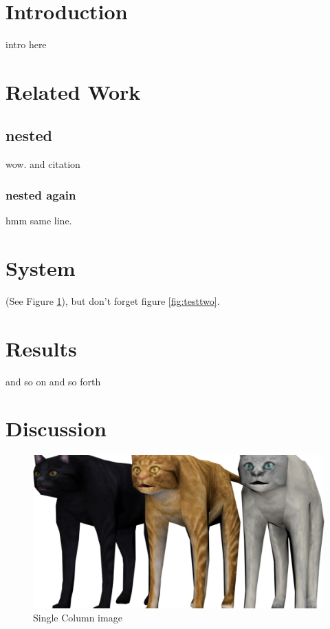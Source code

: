 \documentclass[sigconf, screen, review]{acmart}
\begin{document}

\maketitle

\section{Introduction}
\par intro here

\section{Related Work}
\subsection{nested}
\par wow. and citation \cite{test-key}
\subsubsection{nested again}
\par hmm same line.

\section{System}
\par (See Figure \ref{fig:testone}), but don't forget figure \ref{fig:testtwo}.
\section{Results}
\par and so on and so forth

\section{Discussion}
\begin{figure}[!htbp]
	\centering
	\includegraphics[width=0.85\linewidth]{images/example.png}
	\caption{Single Column image}
	\label{fig:testone}
\end{figure}
\end{document}
